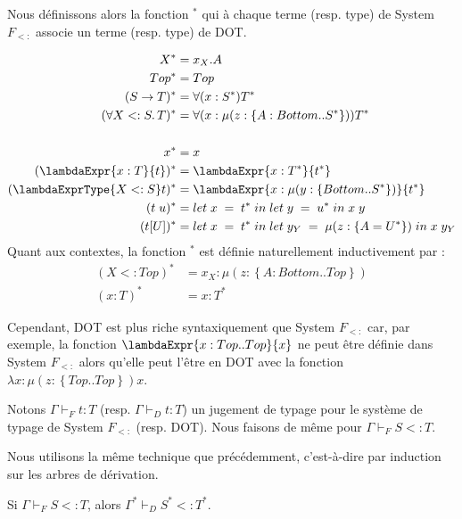 Nous définissons alors la fonction ${}^{*}$ qui à chaque terme (resp. type) de
System $F_{<:}$ associe un terme (resp. type) de DOT.

\begin{align*}
  X^{*} & = x_{X}.A \\
  Top^{*} & = Top \\
  (S \rightarrow T)^{*} & = \forall(x : S^{*}) T^{*} \\
  (\forall X <: S . \, T)^{*} & = \forall(x : \mu(z : \left\{ A : Bottom .. S^{*} \right\})) T^{*} \\ \\
  x^{*} & = x \\
  (\lambdaExpr{x : T}{t})^{*} & = \lambdaExpr{x : T^{*}}{t^{*}} \\
  (\lambdaExprType{X <: S}t)^{*} & = \lambdaExpr{x : \mu(y : \left\{ Bottom .. S^ {*} \right\})}{t^{*}} \\
  (t \; u)^{*} & = \localLetBinding{x}{t^{*}}{\localLetBinding{y}{u^{*}}}{x \; y} \\
  (t[U])^{*} & = \localLetBinding{x}{t^{*}}{\localLetBinding{y_{Y}}{\mu(z : \left\{ A = U^{*} \right\})}{x \; y_{Y}}}
\end{align*}
Quant aux contextes, la fonction ${}^{*}$ est définie naturellement
inductivement par :
\begin{align*}
  (X <: Top)^{*} & = x_{X} : \mu(z : \left\{ A : Bottom .. Top \right\}) \\
  (x : T)^{*} & = x : T^{*}
\end{align*}

Cependant, DOT est plus riche syntaxiquement que System $F_{<:}$ car, par
exemple, la fonction $\lambdaExpr{x : Top .. Top}{x}$ ne peut être définie dans
System $F_{<:}$ alors qu'elle peut l'être en DOT avec la fonction $\lambda{x :
  \mu(z : \left\{ Top .. Top \right\})}{x}$.


Notons $\Gamma \vdash_{F} t : T$ (resp. $\Gamma \vdash_{D} t : T$) un jugement
de typage pour le système de typage de System $F_{<:}$ (resp. DOT). Nous faisons
de même pour $\Gamma \vdash_{F} S <: T$.

Nous utilisons la même technique que précédemment, c'est-à-dire par induction
sur les arbres de dérivation.
\begin{theorem}
  Si $\Gamma \vdash_{F} S <: T$, alors $\Gamma^{*} \vdash_{D} S^{*} <: T^{*}$.
\end{theorem}

